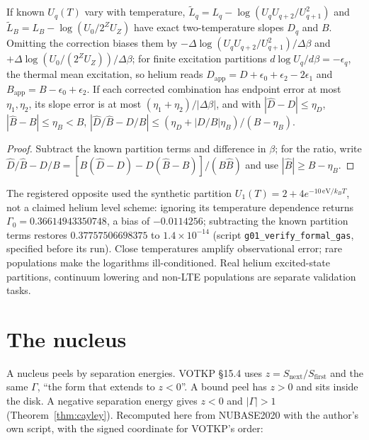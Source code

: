 \begin{theorem}\label{thm:partition}
If known $U_q(T)$ vary with temperature, $\tilde L_q=L_q-\log(U_qU_{q+2}/U_{q+1}^2)$ and $\tilde L_B=L_B-\log(U_0/2^ZU_Z)$ have exact two-temperature slopes $D_q$ and $B$. Omitting the correction biases them by $-\Delta\log(U_qU_{q+2}/U_{q+1}^2)/\Delta\beta$ and $+\Delta\log(U_0/(2^ZU_Z))/\Delta\beta$; for finite excitation partitions $d\log U_q/d\beta=-\epsilon_q$, the thermal mean excitation, so helium reads $D_{\mathrm{app}}=D+\epsilon_0+\epsilon_2-2\epsilon_1$ and $B_{\mathrm{app}}=B-\epsilon_0+\epsilon_2$. If each corrected combination has endpoint error at most $\eta_1,\eta_2$, its slope error is at most $(\eta_1+\eta_2)/|\Delta\beta|$, and with $|\hat D-D|\le\eta_D$, $|\hat B-B|\le\eta_B<B$, $|\hat D/\hat B-D/B|\le(\eta_D+|D/B|\eta_B)/(B-\eta_B)$. 
\end{theorem}
\begin{proof}
Subtract the known partition terms and difference in $\beta$; for the ratio, write $\hat D/\hat B-D/B=[B(\hat D-D)-D(\hat B-B)]/(B\hat B)$ and use $|\hat B|\ge B-\eta_B$.
\end{proof}
The registered opposite used the synthetic partition $U_1(T)=2+4e^{-10\,\mathrm{eV}/k_BT}$, not a claimed helium level scheme: ignoring its temperature dependence returns $\Gamma_0=0.36614943350748$, a bias of $-0.0114256$; subtracting the known partition terms restores $0.37757506698375$ to $1.4\times10^{-14}$  (script \texttt{g01\_verify\_formal\_gas}, specified before its run). Close temperatures amplify observational error; rare populations make the logarithms ill-conditioned. Real helium excited-state partitions, continuum lowering and non-LTE populations are separate validation tasks.

\section{The nucleus}\label{sec:nucleus}
A nucleus peels by separation energies. VOTKP §15.4 uses $z=S_{\mathrm{next}}/S_{\mathrm{first}}$ and the same $\Gamma$, ``the form that extends to $z<0$''. A bound peel has $z>0$ and sits inside the disk. A negative separation energy gives $z<0$ and $|\Gamma|>1$ (Theorem~\ref{thm:cayley}). Recomputed here from NUBASE2020 with the author's own script, with the signed coordinate for VOTKP's order:

